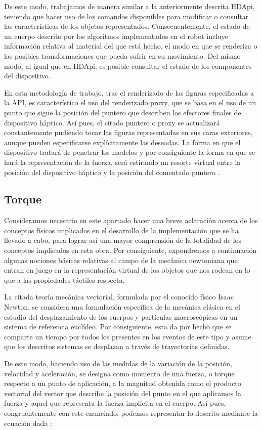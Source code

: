 De este modo, trabajamos de manera similar a la anteriormente descrita HDApi, teniendo que hacer uso de los comandos disponibles para modificar o consultar las características de los objetos representados. Consecuentemente, el estado de un cuerpo descrito por los algoritmos implementados en el robot incluye información relativa al material del que está hecho, el modo en que se renderiza o las posibles transformaciones que pueda sufrir en su movimiento. Del mismo modo, al igual que en HDApi, es posible consultar el estado de los componentes del dispositivo.

En esta metodología de trabajo, tras el renderizado de las figuras especificadas a la API, es característico el uso del renderizado proxy, que se basa en el uso de un punto que sigue la posición del puntero que describen los efectores finales de dispositivo háptico. Así pues, el citado puntero o proxy se actualizará constantemente pudiendo tocar las figuras representadas en sus caras exteriores, aunque pueden especificarse explícitamente las deseadas. La forma en que el dispositivo tratará de penetrar los modelos y por consiguiente la forma en que se hará la representación de la fuerza, será estirando un resorte virtual entre la posición del dispositivo háptico y la posición del comentado puntero \cite{77}.

\subsection{Torque}
Consideramos necesario en este apartado hacer una breve aclaración acerca de los conceptos físicos implicados en el desarrollo de la implementación que se ha llevado a cabo, para lograr así una mayor comprensión de la totalidad de los conceptos implicados en esta obra. Por consiguiente, expondremos a continuación algunas nociones básicas relativas al campo de la mecánica newtoniana que entran  en juego en la representación virtual de los objetos que nos rodean en lo que a las propiedades táctiles respecta.

La citada teoría mecánica vectorial, formulada por el conocido físico Isaac Newton, se considera una formulación específica de la mecánica clásica en el estudio del desplazamiento de los cuerpos y partículas macroscópicas en un sistema de referencia euclídeo. Por consiguiente, esta da por hecho que se comparte un tiempo por todos los presentes en los eventos de este tipo y asume que los descritos sistemas se desplazan a través de  trayectorias definidas.

De este modo, haciendo uso de las medidas de la variación de la posición, velocidad y aceleración, se designa como momento de una fuerza, o torque respecto a un punto de aplicación, a la magnitud obtenida como el producto vectorial del vector que describe la posición del punto en el que aplicamos la fuerza y aquel que representa la fuerza implícita en el cuerpo. Así pues, congruentemente con este enunciado, podemos representar lo descrito mediante la ecuación dada \cite{78,79}:

